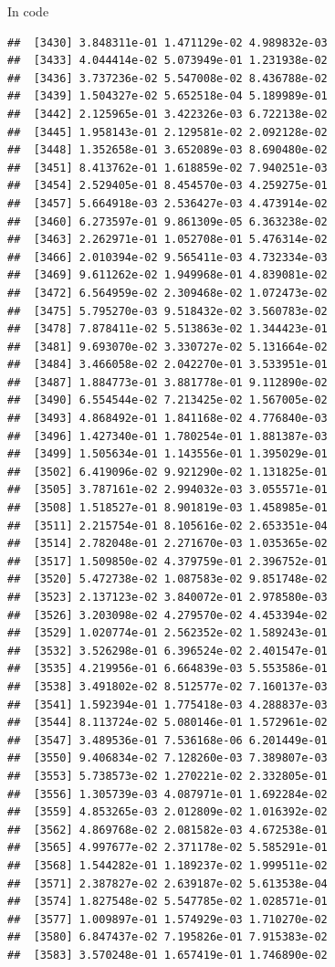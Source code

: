 \documentclass[ignorenonframetext,]{beamer}
\begin{document}
\begin{frame}[fragile]{In code}
\begin{verbatim}
##  [3430] 3.848311e-01 1.471129e-02 4.989832e-03
##  [3433] 4.044414e-02 5.073949e-01 1.231938e-02
##  [3436] 3.737236e-02 5.547008e-02 8.436788e-02
##  [3439] 1.504327e-02 5.652518e-04 5.189989e-01
##  [3442] 2.125965e-01 3.422326e-03 6.722138e-02
##  [3445] 1.958143e-01 2.129581e-02 2.092128e-02
##  [3448] 1.352658e-01 3.652089e-03 8.690480e-02
##  [3451] 8.413762e-01 1.618859e-02 7.940251e-03
##  [3454] 2.529405e-01 8.454570e-03 4.259275e-01
##  [3457] 5.664918e-03 2.536427e-03 4.473914e-02
##  [3460] 6.273597e-01 9.861309e-05 6.363238e-02
##  [3463] 2.262971e-01 1.052708e-01 5.476314e-02
##  [3466] 2.010394e-02 9.565411e-03 4.732334e-03
##  [3469] 9.611262e-02 1.949968e-01 4.839081e-02
##  [3472] 6.564959e-02 2.309468e-02 1.072473e-02
##  [3475] 5.795270e-03 9.518432e-02 3.560783e-02
##  [3478] 7.878411e-02 5.513863e-02 1.344423e-01
##  [3481] 9.693070e-02 3.330727e-02 5.131664e-02
##  [3484] 3.466058e-02 2.042270e-01 3.533951e-01
##  [3487] 1.884773e-01 3.881778e-01 9.112890e-02
##  [3490] 6.554544e-02 7.213425e-02 1.567005e-02
##  [3493] 4.868492e-01 1.841168e-02 4.776840e-03
##  [3496] 1.427340e-01 1.780254e-01 1.881387e-03
##  [3499] 1.505634e-01 1.143556e-01 1.395029e-01
##  [3502] 6.419096e-02 9.921290e-02 1.131825e-01
##  [3505] 3.787161e-02 2.994032e-03 3.055571e-01
##  [3508] 1.518527e-01 8.901819e-03 1.458985e-01
##  [3511] 2.215754e-01 8.105616e-02 2.653351e-04
##  [3514] 2.782048e-01 2.271670e-03 1.035365e-02
##  [3517] 1.509850e-02 4.379759e-01 2.396752e-01
##  [3520] 5.472738e-02 1.087583e-02 9.851748e-02
##  [3523] 2.137123e-02 3.840072e-01 2.978580e-03
##  [3526] 3.203098e-02 4.279570e-02 4.453394e-02
##  [3529] 1.020774e-01 2.562352e-02 1.589243e-01
##  [3532] 3.526298e-01 6.396524e-02 2.401547e-01
##  [3535] 4.219956e-01 6.664839e-03 5.553586e-01
##  [3538] 3.491802e-02 8.512577e-02 7.160137e-03
##  [3541] 1.592394e-01 1.775418e-03 4.288837e-03
##  [3544] 8.113724e-02 5.080146e-01 1.572961e-02
##  [3547] 3.489536e-01 7.536168e-06 6.201449e-01
##  [3550] 9.406834e-02 7.128260e-03 7.389807e-03
##  [3553] 5.738573e-02 1.270221e-02 2.332805e-01
##  [3556] 1.305739e-03 4.087971e-01 1.692284e-02
##  [3559] 4.853265e-03 2.012809e-02 1.016392e-02
##  [3562] 4.869768e-02 2.081582e-03 4.672538e-01
##  [3565] 4.997677e-02 2.371178e-02 5.585291e-01
##  [3568] 1.544282e-01 1.189237e-02 1.999511e-02
##  [3571] 2.387827e-02 2.639187e-02 5.613538e-04
##  [3574] 1.827548e-02 5.547785e-02 1.028571e-01
##  [3577] 1.009897e-01 1.574929e-03 1.710270e-02
##  [3580] 6.847437e-02 7.195826e-01 7.915383e-02
##  [3583] 3.570248e-01 1.657419e-01 1.746890e-02

\end{verbatim}
\end{frame}
\end{document}
